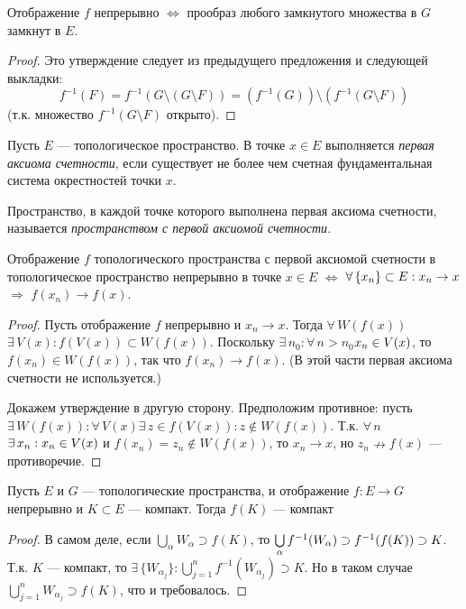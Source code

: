 \documentclass[10pt,titlepage, a4paper]{article}
\begin{document}
\begin{predl}\label{predl.zamk->zamk}
Отображение $f$ непрерывно $\Leftrightarrow$ прообраз любого
замкнутого множества в $G$ замкнут в $E$.
\end{predl}

\begin{proof}
Это утверждение следует из предыдущего предложения и следующей
выкладки: $$f^{-1}(F)=f^{-1}(G\setminus (G\setminus F))=(f^{-1}(G))
\setminus(f^{-1}(G\setminus F))$$ (т.к. множество $f^{-1}(G\setminus
F)$ открыто).
\end{proof}

\begin{defen}
Пусть $E$ --- топологическое пространство. В точке $x\in E$
выполняется \emph{первая аксиома счетности}, если существует не
более чем счетная фундаментальная система окрестностей точки $x$.

Пространство, в каждой точке которого выполнена первая аксиома
счетности, называется \emph{пространством с первой аксиомой
счетности}.
\end{defen}

\begin{theorem}
Отображение $f$ топологического пространства с первой аксиомой
счетности в топологическое пространство непрерывно в точке $x\in E$
$\Leftrightarrow$ $\forall\,\{x_n\}\p\subset E:x_n\to x$
$\Rightarrow$ $f(x_n)\to f(x)$.
\end{theorem}

\begin{proof}
Пусть отображение $f$ непрерывно и $x_n\to x$. Тогда
$\forall\,W(f(x))$\;\;$\exists\, V(x):f(V(x))\subset W(f(x))$.
Поскольку $\exists\,n_0:\forall\,n>n_0$\;\;$x_n\p\in V(x)$, то
$f(x_n)\in W(f(x))$, так что $f(x_n)\to f(x)$. (В этой части первая
аксиома счетности не используется.)

Докажем утверждение в другую сторону. Предположим противное: пусть
$\exists\, W(f(x)):\forall\,V(x)$\;\;$\exists\,z\in f(V(x)):z\not\in
W(f(x))$. Т.к. $\forall\,n$\;\;$\exists\,x_n:x_n\p\in V(x)$ и
$f(x_n)=z_n\not\in W(f(x))$, то $x_n\to x$, но $z_n\nrightarrow
f(x)$ --- противоречие.
\end{proof}

\begin{predl}
Пусть $E$ и $G$ --- топологические пространства, и отображение
$f\colon E\to G$ непрерывно и $K\subset E$ --- компакт. Тогда $f(K)$
--- компакт
\end{predl}

\begin{proof}
В самом деле, если $\bigcup\limits_\alpha W_\alpha\supset f(K)$, то
$\bigcup\limits_{\alpha}f^{-1}(W_\alpha)\p\supset
f^{-1}(f(K))\supset K$. Т.к. $K$ --- компакт, то
$\exists\,\{W_{\alpha_j}\}:\bigcup\limits_{j=1}^n
f^{-1}(W_{\alpha_j})\supset K$. Но в таком случае
$\bigcup\limits_{j=1}^n W_{\alpha_j}\supset f(K)$, что и
требовалось.
\end{proof}
\end{document}
